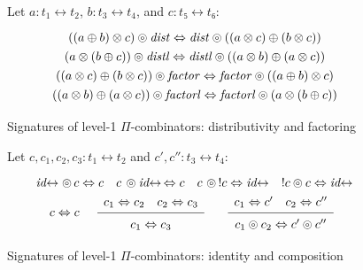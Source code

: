 \documentclass{article}
\newcommand{\dist}{\mathit{dist}}
\newcommand{\factor}{\mathit{factor}}
\newcommand{\distl}{\mathit{distl}}
\newcommand{\factorl}{\mathit{factorl}}
\newcommand{\idc}{\mathit{id}\!\!\leftrightarrow}
\newcommand{\Rule}[4]{
\makebox{{\rm #1}
$\displaystyle
\frac{\begin{array}{l}#2 \\\end{array}}
{\begin{array}{l}#3      \\\end{array}}$
 #4}}
\begin{document}
\begin{figure}[t]
Let $a : t_1 \leftrightarrow t_2$, $b : t_3 \leftrightarrow t_4$, and $c : t₅ \leftrightarrow t₆$:
\[\def\arraystretch{1.3}
\begin{array}{c}
  {((a \oplus b) \otimes c) \circledcirc \dist \Leftrightarrow \dist \circledcirc ((a \otimes c) \oplus (b \otimes c))}
\\
  {(a \otimes (b \oplus c)) \circledcirc \distl \Leftrightarrow \distl \circledcirc ((a \otimes b) \oplus (a \otimes c))}
\\
  {((a \otimes c) \oplus (b \otimes c)) \circledcirc \factor \Leftrightarrow \factor \circledcirc ((a \oplus b) \otimes c)}
\\
  {((a \otimes b) \oplus (a \otimes c)) \circledcirc \factorl \Leftrightarrow \factorl \circledcirc (a \otimes (b \oplus c))}
\end{array}\]
\caption{\label{figi}Signatures of level-1 $\Pi$-combinators: distributivity and factoring}
\end{figure}

\begin{figure}[t]
Let $c, c_1, c_2, c_3 : t_1 \leftrightarrow t_2$ and $c', c'' : t_3 \leftrightarrow t_4$: 
\[\def\arraystretch{1.3}
\begin{array}{c}
  {\idc \circledcirc \, c \Leftrightarrow c}
\quad 
  {c \, \circledcirc \idc \, \Leftrightarrow c}
\quad
  {c\,\, \circledcirc\,! c \Leftrightarrow \idc}
\quad 
  {! c \circledcirc c \Leftrightarrow \idc}
\\
  {c \Leftrightarrow c}
\quad 
\Rule{}
  {c_1 \Leftrightarrow c_2 \quad c_2 \Leftrightarrow c_3}
  {c_1 \Leftrightarrow c_3}
  {} 
\quad
\Rule{}
  {c_1 \Leftrightarrow c' \quad c_2 \Leftrightarrow c''}
  {c_1 \circledcirc c_2 \Leftrightarrow c' \circledcirc c''}
  {}
\end{array}\]
\caption{\label{figh}Signatures of level-1 $\Pi$-combinators: identity and composition}
\end{figure}
\end{document}
